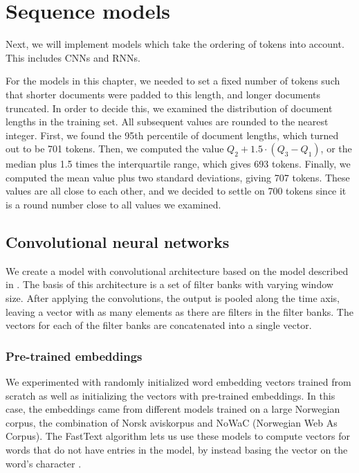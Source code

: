 \chapter{Sequence models}

Next, we will implement models which take the ordering of tokens into
account. This includes \acp{CNN} and \acp{RNN}.

For the models in this chapter, we needed to set a fixed number of tokens
such that shorter documents were padded to this length, and longer documents
truncated. In order to decide this, we examined the distribution of document
lengths in the training set. All subsequent values are rounded to the nearest
integer. First, we found the 95th percentile of document lengths, which
turned out to be 701 tokens. Then, we computed the value $Q_2 + 1.5 \cdot
(Q_3 - Q_1)$, or the median plus 1.5 times the interquartile range, which
gives 693 tokens. Finally, we computed the mean value plus two standard
deviations, giving 707 tokens. These values are all close to each other, and
we decided to settle on 700 tokens since it is a round number close to all
values we examined.


\section{Convolutional neural networks}

We create a model with convolutional architecture based on the model
described in \textcite{zhang2017sensitivity}. The basis of this architecture
is a set of filter banks with varying window size. After applying the
convolutions, the output is pooled along the time axis, leaving a vector with
as many elements as there are filters in the filter banks. The vectors for
each of the filter banks are concatenated into a single vector.


\subsection{Pre-trained embeddings}

We experimented with randomly initialized word embedding vectors trained from
scratch as well as initializing the vectors with pre-trained embeddings. In
this case, the embeddings came from different models trained on a large
Norwegian corpus, the combination of Norsk aviskorpus and NoWaC (Norwegian
Web As Corpus). The FastText algorithm lets us use these models to compute
vectors for words that do not have entries in the model, by instead basing
the vector on the word's character \ngrams.

